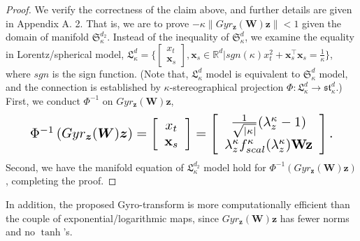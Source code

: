\begin{mymath}
\begin{proof}
We verify the correctness of the claim above, and further details are given in Appendix A. 2. 
That is, we are to prove $-\kappa\lVert Gyr_{\boldsymbol z}(\boldsymbol W)\boldsymbol z \rVert <1$ given the domain of manifold $\mathfrak{S}_{\kappa }^{d_2}$.
Instead of the inequality of $\mathfrak{S}_{\kappa }^{d}$, 
we examine the equality in Lorentz/spherical model,
$\mathfrak{L}_{\kappa }^{d}=\{ 
\left[\begin{array}{c}
x_t  \\
\boldsymbol x_s 
\end{array}\right], 
\boldsymbol x_s \in \mathbb R^d
| sgn(\kappa)x^2_t + \boldsymbol x_s^\top\boldsymbol x_s = \frac{1}{\kappa}\}$,
where $sgn$ is the sign function.
(Note that, 
$\mathfrak{L}_{\kappa }^{d}$ model
is equivalent to $\mathfrak{S}_{\kappa }^{d}$ model, 
and the connection is established by $\kappa$-stereographical projection $\Phi: \mathfrak{L}_{\kappa }^{d} \to \mathfrak{st}_{\kappa }^{d}$.)
First, we conduct $\Phi^{-1}$ on $Gyr_{\boldsymbol z}(\boldsymbol W)\boldsymbol z$,
\begin{align}
\resizebox{0.9\hsize}{!}{$
\Phi^{-1}\left(Gyr_{\boldsymbol z}(\boldsymbol W)\boldsymbol z\right)
=\left[\begin{array}{c}
x_t  \\
\mathbf x_s \nonumber
\end{array}\right]
=\left[\begin{array}{c}
\frac{1}{\sqrt{ |\kappa|}}(\lambda_z^\kappa-1)  \\
\lambda_z^\kappa f_{scal}^\kappa(\lambda_z^\kappa)\mathbf W\mathbf z
\end{array}\right]. 
$}
\end{align}
Second, we have the manifold equation of $\mathfrak{L}_{\kappa }^{d_2}$ model 
hold for $\Phi^{-1}\left(Gyr_{\boldsymbol z}(\boldsymbol W)\boldsymbol z\right)$, completing the proof.
\end{proof}
\end{mymath}

\noindent In addition, the proposed Gyro-transform is more computationally efficient than the couple of exponential/logarithmic maps, since $Gyr_{\boldsymbol z}(\boldsymbol W)\boldsymbol z$ has fewer norms and no $\tanh$'s.


